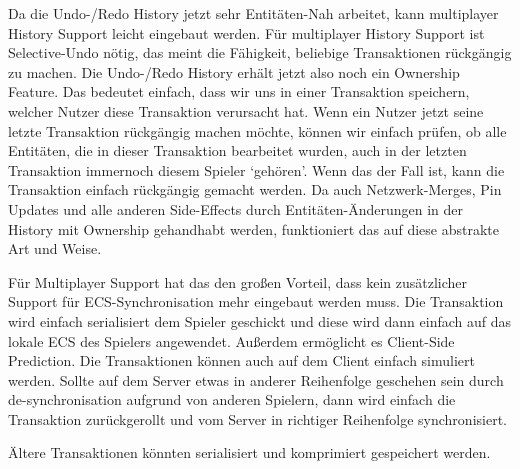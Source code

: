 \documentclass[11pt]{article}
\begin{document}
    Da die Undo-/Redo History jetzt sehr Entitäten-Nah arbeitet, kann multiplayer History Support leicht eingebaut werden.
    Für multiplayer History Support ist Selective-Undo nötig, das meint die Fähigkeit, beliebige Transaktionen rückgängig zu machen.
    Die Undo-/Redo History erhält jetzt also noch ein Ownership Feature.
    Das bedeutet einfach, dass wir uns in einer Transaktion
    speichern, welcher Nutzer diese Transaktion verursacht hat.
    Wenn ein Nutzer jetzt seine letzte Transaktion rückgängig machen möchte,
    können wir einfach prüfen, ob alle Entitäten, die in dieser Transaktion bearbeitet wurden, auch in der letzten Transaktion immernoch
    diesem Spieler `gehören'.
    Wenn das der Fall ist, kann die Transaktion einfach rückgängig gemacht werden.
    Da auch Netzwerk-Merges, Pin Updates und alle anderen Side-Effects durch Entitäten-Änderungen in der History mit Ownership gehandhabt
    werden, funktioniert das auf diese abstrakte Art und Weise.

    Für Multiplayer Support hat das den großen Vorteil, dass kein zusätzlicher Support für ECS-Synchronisation mehr eingebaut werden muss.
    Die Transaktion wird einfach serialisiert dem Spieler geschickt und diese wird dann einfach auf das lokale ECS des Spielers angewendet.
	Außerdem ermöglicht es Client-Side Prediction.
    Die Transaktionen können auch auf dem Client einfach simuliert werden.
    Sollte auf dem Server etwas in anderer Reihenfolge geschehen sein durch de-synchronisation aufgrund von anderen Spielern,
    dann wird einfach die Transaktion
	zurückgerollt und vom Server in richtiger Reihenfolge synchronisiert.

	Ältere Transaktionen könnten serialisiert und komprimiert gespeichert werden.
\end{document}
